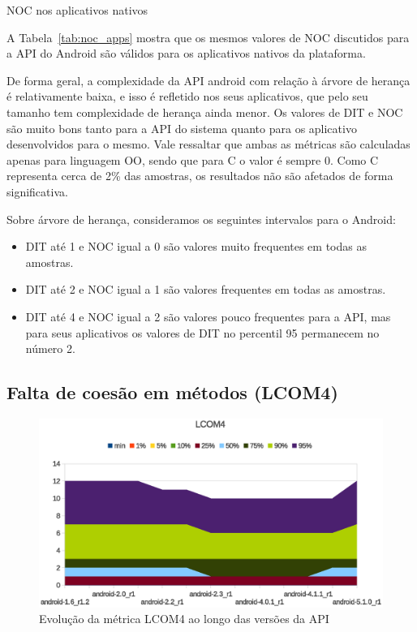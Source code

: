 \begin{table}[!htb]
\centering
{}

\caption{NOC nos aplicativos nativos}
\label{tab:noc_apps}
\end{table}

A Tabela~\ref{tab:noc_apps} mostra que os mesmos valores de NOC discutidos para a API do Android são válidos para os aplicativos nativos da plataforma. 

De forma geral, a complexidade da API android com relação à árvore de herança é relativamente baixa, e isso é refletido nos seus aplicativos, que pelo seu tamanho tem complexidade de herança ainda menor. Os valores de DIT e NOC são muito bons tanto para a API do sistema quanto para os aplicativo desenvolvidos para o mesmo. Vale ressaltar que ambas as métricas são calculadas apenas para linguagem OO, sendo que para C o valor é sempre 0. Como C representa cerca de 2\% das amostras, os resultados não são afetados de forma significativa.

Sobre árvore de herança, consideramos os seguintes intervalos para o Android:

\begin{itemize}
\item DIT até 1 e NOC igual a 0 são valores muito frequentes em todas as amostras.
\item DIT até 2 e NOC igual a 1 são valores frequentes em todas as amostras.
\item DIT até 4 e NOC igual a 2 são valores pouco frequentes para a API, mas para seus aplicativos os valores de DIT no percentil 95 permanecem no número 2.
\end{itemize}

\subsection{Falta de coesão em métodos (LCOM4)}

\begin{figure}[!htb]
\centering
\includegraphics [keepaspectratio=true,scale=0.85]{figuras/graphs/lcom4_android.eps}
\caption{Evolução da métrica LCOM4 ao longo das versões da API}
\label{fig:lcom4_android}
\end{figure}

